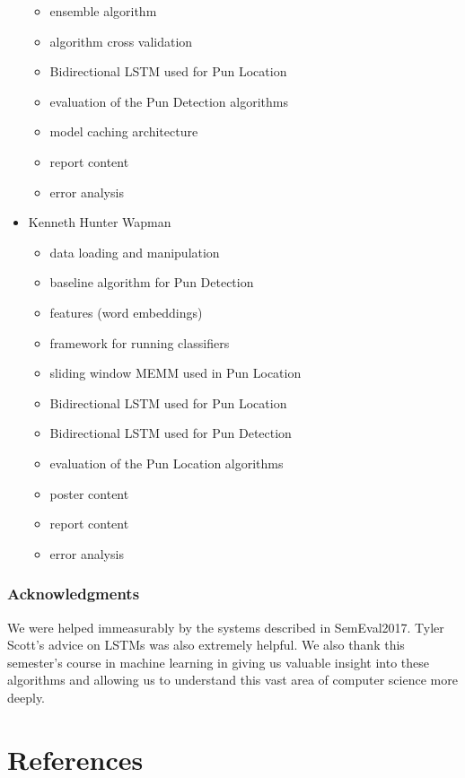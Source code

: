 \documentclass{article}
\begin{document}
\begin{itemize}
\begin{itemize}
		\item ensemble algorithm
		\item algorithm cross validation
		\item Bidirectional LSTM used for Pun Location
		\item evaluation of the Pun Detection algorithms
		\item model caching architecture
		\item report content 
		\item error analysis
	\end{itemize}
\item Kenneth Hunter Wapman
	\begin{itemize}
		\item data loading and manipulation
		\item baseline algorithm for Pun Detection
		\item features (word embeddings)
		\item framework for running classifiers
		\item sliding window MEMM used in Pun Location
		\item Bidirectional LSTM used for Pun Location
		\item Bidirectional LSTM used for Pun Detection
		\item evaluation of the Pun Location algorithms
		\item poster content
		\item report content
		\item error analysis
	\end{itemize}
\end{itemize}

\subsubsection*{Acknowledgments}

We were helped immeasurably by the systems described in SemEval2017. Tyler
Scott's advice on LSTMs was also extremely helpful. We also thank this semester's course in machine learning in giving us valuable insight into these algorithms and allowing us to understand this vast area of computer science more deeply.

\section*{References}
\end{document}

